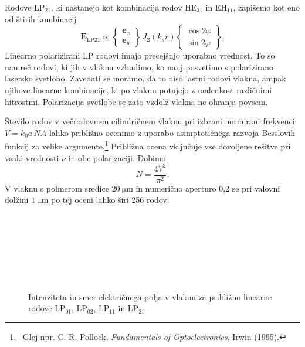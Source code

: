 Rodove LP$_{21}$, ki nastanejo kot kombinacija rodov HE$_{31}$
in EH$_{11}$, zapišemo kot eno od štirih kombinacij
\begin{equation}
\mathbf{E}_\mathrm{LP21} \propto \left \{
  \begin{matrix}
  \mathbf{e}_x \\ \mathbf{e}_y 
  \end{matrix}
\right \} \, J_2(k_s r)
\left \{
  \begin{matrix}
  \cos 2 \varphi  \\ \sin 2 \varphi 
  \end{matrix}
\right \}\!.
\end{equation}
Linearno polarizirani LP rodovi imajo precejšnjo uporabno vrednost. To so 
namreč rodovi, ki jih v vlaknu vzbudimo, ko nanj posvetimo s polarizirano 
lasersko svetlobo. Zavedati  se moramo, da to niso lastni rodovi vlakna, 
ampak njihove linearne kombinacije, ki po vlaknu potujejo z malenkost različnimi
hitrostmi. Polarizacija svetlobe se zato vzdolž vlakna ne ohranja povsem.
\begin{remark}
Število rodov v večrodovnem cilindričnem vlaknu pri izbrani normirani 
frekvenci $V = k_0a\, NA$ lahko približno ocenimo z uporabo asimptotičnega 
razvoja Besslovih funkcij za velike argumente.\footnote{~Glej npr. C. R. Pollock, {\it Fundamentals 
of Optoelectronics}, Irwin (1995).} Približna ocena vključuje 
vse dovoljene rešitve pri vsaki vrednosti $\nu$ in obe polarizaciji. 
Dobimo 
\begin{equation} 
N = \frac{4 V^2}{\pi^2}.
\end{equation}
V vlaknu s polmerom sredice $20~\si{\micro\meter}$ in numerično aperturo 0,2
se  pri valovni dolžini $1~\si{\micro\meter}$ po tej oceni lahko širi 256 rodov. 
\end{remark}
\begin{figure}[ht]
\centering
\def\svgwidth{93truemm} 
 \\
\def\svgwidth{93truemm} 
 \\
\def\svgwidth{93truemm} 
 \\
\def\svgwidth{93truemm} 
 \\
\def\svgwidth{93truemm} 
 \\
\def\svgwidth{93truemm} 
 \\
\caption{Intenziteta in smer električnega polja v vlaknu za približno linearne rodove
LP$_{01}$, LP$_{02}$, LP$_{11}$ in LP$_{21}$}
\label{fig:LP}
\end{figure}

